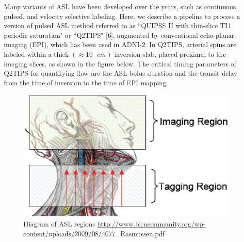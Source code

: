 \documentclass[letterpaper,11pt]{article}
\newcommand{\s}{\text{ }} %
\newcommand{\med}{\scriptsize}
\begin{document}
Many variants of ASL have been developed over the years, such as continuous, pulsed, and velocity selective labeling. Here, we describe a pipeline to process a version of pulsed ASL method  referred to as ``QUIPSS II with thin-slice TI1 periodic saturation" or ``Q2TIPS" [6], augmented by conventional echo-planar imaging (EPI), which has been used in ADNI-2. In Q2TIPS, arterial spins are labeled within a thick $(\approx{10}\s cm)$ inversion slab, placed proximal to the imaging slices, as shown in the figure below. The critical timing parameters of Q2TIPS for quantifying flow are the ASL bolus duration  and the transit delay  from the time of inversion to the time of EPI mapping. 

\begin{figure}[H]
\centering\includegraphics[scale = 0.50]{CBF_regions_diagram.eps}
\caption*{Diagram of ASL regions \newline \med\protect\url{http://www.birncommunity.org/wp-content/uploads/2009/08/4077_Rasmussen.pdf} }
\end{figure}
\end{document}
